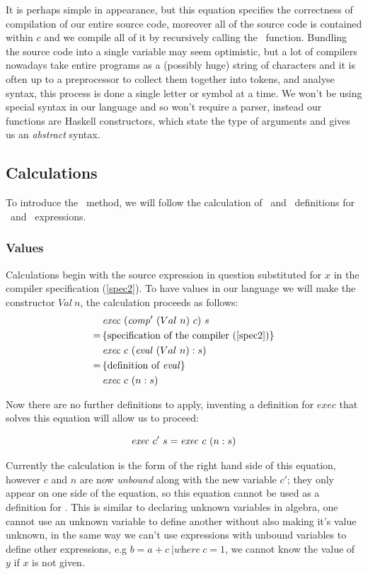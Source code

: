 \documentclass {article}
\begin{document}
It is perhaps simple in appearance,
but this equation
specifies the correctness of compilation of our entire source code,
moreover all of the source code is contained within  $c$
and we compile all of it by recursively calling the \compp\ function.
Bundling the source code into a 
single variable may seem optimistic, but a lot of compilers nowadays 
take entire programs as a (possibly huge) string of characters
and it is often up to a preprocessor to collect 
them together into tokens, and analyse syntax, 
this process is done a single letter or symbol at a time\cite{dragon}.
We won't be using special syntax in our language and so won't
require a parser, instead our functions are  Haskell constructors, 
which state the type of arguments and gives us an \emph{abstract} syntax.

\subsection{Calculations}

To introduce the \BH\ method,
we will follow the 
calculation of \comp\ and \exec\ definitions
for \val\ and \add\ expressions\cite[\S2.5]{bandh}.

\subsubsection{Values}

Calculations begin with the source expression in question 
substituted for $x$ in the compiler specification (\ref{spec2}).
To have values in our language we will make the constructor
$Val\ n$, 
the calculation proceeds as follows\cite{bandh}:
\begin{align*}
&\mathit{exec\ } (\mathit{comp'\ } (Val\ n)\ c)\ s \\
=\, & \{ \mbox{specification of the compiler (\ref{spec2})} \} \\
&\mathit{exec\ } c\ (\mathit{eval\ } (Val\ n) : s) \\
=\, & \{ \mbox{definition of \textit{eval}} \} \\
&\mathit{exec\ } c\ (n:s)
\end{align*}

Now there are no further definitions to apply,
inventing a definition for $exec$ that solves this equation
will allow us to proceed:

\[ \mathit{exec\ }  c'\ s = \mathit{exec\ }  c\ (n : s) \]

Currently the calculation is the form of
the right hand side of this equation,
however $c$ and $n$ are now \emph{unbound}
along with the new variable $c'$;
they only appear on one side of the equation,
so this equation cannot be used  as a definition
for \exec.
This is similar to declaring unknown variables 
in algebra, one cannot use an unknown variable to define
another without also making it's value unknown,
in the same way we can't use expressions with
unbound variables to define other expressions,
e.g \(b = a + c\ | \textit{where}\ c = 1\), we cannot
know the value of $y$ if $x$ is not given.
\end{document}
